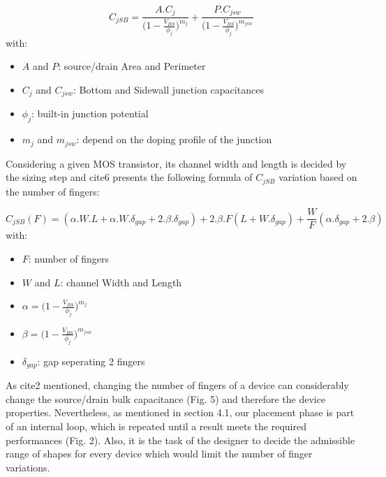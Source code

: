 \begin{equation}\label{1}
C_{jSB} = \frac{A.C_j}{\Big(1-\frac{V_{BS}}{\phi _j}\Big)^{m_j}}+\frac{P.C_{jsw}}{\Big(1-\frac{V_{BS}}{\phi _j}\Big)^{m_{jsw}}}
\end{equation}
with:
\begin{itemize}
  \setlength\itemsep{0em}
\item $A$ and $P$: source/drain Area and Perimeter
\item $C_j$ and $C_{jsw}$: Bottom and Sidewall junction capacitances 
\item $\phi _j$: built-in junction potential
\item $m_j$ and $m_{jsw}$: depend on the doping profile of the junction
\end{itemize}

Considering a given MOS transistor, its channel width and length is decided by the sizing step and cite{6} presents the following formula of $C_{jSB}$ variation based on the number of fingers:

\vspace{-0.5cm}
\begin{equation}
C_{jSB}(F) = (\alpha .W.L+\alpha .W.\delta _{gap} + 2.\beta .\delta _{gap})+2.\beta .F(L+W.\delta _{gap})+\frac{W}{F} (\alpha .\delta _{gap}+2.\beta)
\end{equation}
with:
\begin{itemize}\label{2}
  \setlength\itemsep{0em}
\item $F$: number of fingers
\item $W$ and $L$: channel Width and Length
\item $\alpha = \Big(1-\frac{V_{BS}}{\phi _j}\Big)^{m_j}$
\item $\beta = \Big(1-\frac{V_{BS}}{\phi _j}\Big)^{m_{jsw}}$
\item $\delta _{gap}$: gap seperating 2 fingers 
\end{itemize}

As cite{2} mentioned, changing the number of fingers of a device can considerably change the source/drain bulk capacitance (Fig. 5) and therefore the device properties. Nevertheless, as mentioned in section 4.1, our placement phase is part of an internal loop, which is repeated until a result meets the required performances (Fig. 2). Also, it is the task of the designer to decide the admissible range of shapes for every device which would limit the number of finger variations.

